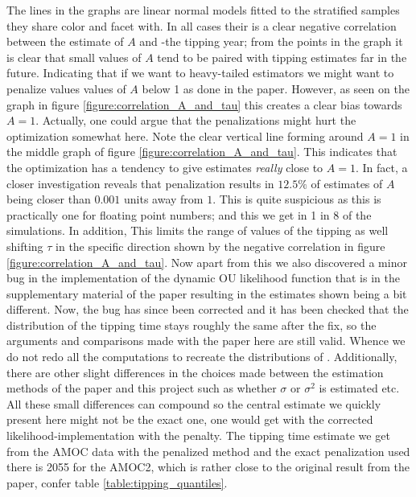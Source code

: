The lines in the graphs are linear normal models fitted to the stratified samples they share color and facet with. In all cases their is a clear negative correlation between the estimate of $A$ and -the tipping year; from the points in the graph it is clear that small values of $A$ tend to be paired with tipping estimates far in the future. Indicating that if we want to heavy-tailed estimators we might want to penalize values values of $A$ below 1 as done in the paper. However, as seen on the graph in figure \ref{figure:correlation_A_and_tau} this creates a clear bias towards $A = 1$. Actually, one could argue that the penalizations might hurt the optimization somewhat here. Note the clear vertical line forming around $A = 1$ in the middle graph of figure \ref{figure:correlation_A_and_tau}. This indicates that the optimization has a tendency to give estimates \textit{really} close to $A = 1$. In fact, a closer investigation reveals that penalization results in $12.5\%$ of estimates of $A$ being closer than $0.001$ units away from $1$. This is quite suspicious as this is practically one for floating point numbers; and this we get in 1 in 8 of the simulations. In addition, This limits the range of values of the tipping as well shifting $\tau$ in the specific direction shown by the negative correlation in figure \ref{figure:correlation_A_and_tau}. Now apart from this we also discovered a minor bug in the implementation of the dynamic OU likelihood function that is in the supplementary material of the paper resulting in the estimates shown being a bit different. Now, the bug has since been corrected and it has been checked that the distribution of the tipping time stays roughly the same after the fix, so the arguments and comparisons made with the paper here are still valid. Whence we do not redo all the computations to recreate the distributions of \cite{Ditlevsen2023}. Additionally, there are other slight differences in the choices made between the estimation methods of the paper and this project such as whether $\sigma$ or $\sigma^2$ is estimated etc. All these small differences can compound so the central estimate we quickly present here might not be the exact one, one would get with the corrected likelihood-implementation with the penalty. The tipping time estimate we get from the AMOC data with the penalized method and the exact penalization used there is 2055 for the AMOC2, which is rather close to the original result from the paper, confer table \ref{table:tipping_quantiles}.  
